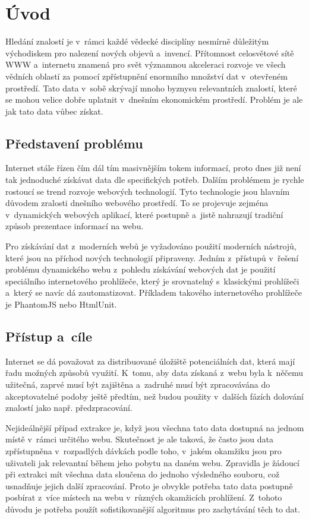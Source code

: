 \documentclass[11pt,a4paper]{article}
\begin{document}
\section{Úvod}
Hledání znalostí je v~rámci každé vědecké disciplíny nesmírně důležitým východiskem pro nalezení nových objevů a~invencí. Přítomnost celosvětové sítě WWW a~internetu znamená pro svět významnou akceleraci rozvoje ve všech vědních oblastí za pomocí zpřístupnění enormního množství dat v~otevřeném prostředí. Tato data v~sobě skrývají mnoho byznysu relevantních znalostí, které se mohou velice dobře uplatnit v~dnešním ekonomickém prostředí. Problém je ale jak tato data vůbec získat.

\subsection{Představení problému}
Internet stále řízen čím dál tím masivnějším tokem informací, proto dnes již není tak jednoduché získávat data dle specifických potřeb. Dalším problémem je rychle rostoucí se trend rozvoje webových technologií. Tyto technologie jsou hlavním důvodem zralosti dnešního webového prostředí. To se projevuje zejména v~dynamických webových aplikací, které postupně a~jistě nahrazují tradiční způsob prezentace informací na webu. 

Pro získávání dat z~moderních webů je vyžadováno použití moderních nástrojů, které jsou na příchod nových technologií připraveny. Jedním z~přístupů v~řešení problému dynamického webu z~pohledu získávání webových dat je použití speciálního internetového prohlížeče, který je srovnatelný s~klasickými prohlížeči a~který se navíc dá zautomatizovat. Příkladem takového internetového prohlížeče je PhantomJS\cite{phantomjs} nebo HtmlUnit.

\subsection{Přístup a~cíle}
Internet se dá považovat za distribuované úložiště potenciálních dat, která mají řadu možných způsobů využití. K~tomu, aby data získaná z~webu byla k~něčemu užitečná, zaprvé musí být zajištěna a~zadruhé musí být zpracovávána do akceptovatelné podoby ještě předtím, než budou použity v~dalších fázích dolování znalostí jako např. předzpracování. 

Nejideálnější případ extrakce je, když jsou všechna tato data dostupná na jednom místě v~rámci určitého webu. Skutečnost je ale taková, že často jsou data zpřístupněna v~rozpadlých dávkách podle toho, v~jakém okamžiku jsou pro uživateli jak relevantní během jeho pobytu na daném webu. Zpravidla je žádoucí při extrakci mít všechna data sloučena do jednoho výsledného souboru, což usnadňuje jejich další zpracování. Proto je obvykle potřeba tato data postupně posbírat z~více místech na webu v~různých okamžicích prohlížení. Z~tohoto důvodu je potřeba použít sofistikovanější algoritmus pro zachytávání těch to dat.
\end{document}
